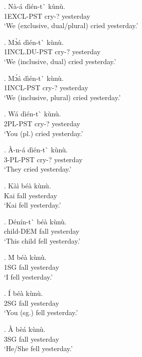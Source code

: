 \documentclass{assets/fieldnotes}
\begin{document}
{\exg. N\`{a}-\'{a} d\`{i}\'{e}n-t\`{} k\`{u}n\`{u}. \\
1EXCL-PST cry-? yesterday \\
`We (exclusive, dual/plural) cried yesterday.'

\exg. M\`{ɔ}\'{a} d\`{i}\'{e}n-t\`{} k\`{u}n\`{u}. \\
1INCL.DU-PST cry-? yesterday \\
`We (inclusive, dual) cried yesterday.'

\exg. M\'{ɔ}\'{a} d\`{i}\'{e}n-t\`{} k\`{u}n\`{u}. \\
1INCL-PST cry-? yesterday \\
`We (inclusive, plural) cried yesterday.'

\exg. W\'{a} d\`{i}\'{e}n-t\`{} k\`{u}n\`{u}. \\
2PL-PST cry-? yesterday \\
`You (pl.) cried yesterday.' 

\exg. \`{A}-n-\'{a} d\`{i}\'{e}n-t\`{} k\`{u}n\`{u}. \\
3-PL-PST cry-? yesterday \\
`They cried yesterday.'


\exg. K\`{a}\`{i} b\'{e}\`{a} k\`{u}n\`{u}. \\
Kai fall yesterday \\
`Kai fell yesterday.'

\exg. D\'{e}n\'{i}n-t\`{} b\'{e}\`{a} k\`{u}n\`{u}. \\
child-DEM fall yesterday \\
`This child fell yesterday.'

\exg. \'{M} b\'{e}\`{a} k\`{u}n\`{u}. \\
1SG fall yesterday \\
`I fell yesterday.' 

\exg. \'{I} b\'{e}\`{a} k\`{u}n\`{u}. \\
2SG fall yesterday \\
`You (sg.) fell yesterday.' 

\exg. \`{A} b\`{e}\'{a} k\`{u}n\`{u}. \\
3SG fall yesterday \\
`He/She fell yesterday.'

}
\end{document}
